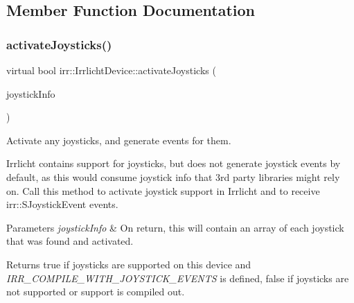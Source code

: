 \subsection{Member Function Documentation}
\mbox{\label{classirr_1_1IrrlichtDevice_af06f8d2c4fdffd1f879e46685bcbc6e3}} 
\subsubsection{\texorpdfstring{activate\+Joysticks()}{activateJoysticks()}\hspace{0.1cm}{\footnotesize\ttfamily [1/3]}}
{\footnotesize\ttfamily virtual bool irr\+::\+Irrlicht\+Device\+::activate\+Joysticks (\begin{DoxyParamCaption}\item[{\hyperlink{classirr_1_1core_1_1array}{core\+::array}$<$ \hyperlink{structirr_1_1SJoystickInfo}{S\+Joystick\+Info} $>$ \&}]{joystick\+Info }\end{DoxyParamCaption})\hspace{0.3cm}{\ttfamily [pure virtual]}}



Activate any joysticks, and generate events for them. 

Irrlicht contains support for joysticks, but does not generate joystick events by default, as this would consume joystick info that 3rd party libraries might rely on. Call this method to activate joystick support in Irrlicht and to receive irr\+::\+S\+Joystick\+Event events. 
\begin{DoxyParams}{Parameters}
{\em joystick\+Info} & On return, this will contain an array of each joystick that was found and activated. \\
\hline
\end{DoxyParams}
\begin{DoxyReturn}{Returns}
true if joysticks are supported on this device and {\itshape I\+R\+R\+\_\+\+C\+O\+M\+P\+I\+L\+E\+\_\+\+W\+I\+T\+H\+\_\+\+J\+O\+Y\+S\+T\+I\+C\+K\+\_\+\+E\+V\+E\+N\+TS} is defined, false if joysticks are not supported or support is compiled out. 
\end{DoxyReturn}
\mbox{\label{classirr_1_1IrrlichtDevice_af06f8d2c4fdffd1f879e46685bcbc6e3}} 
